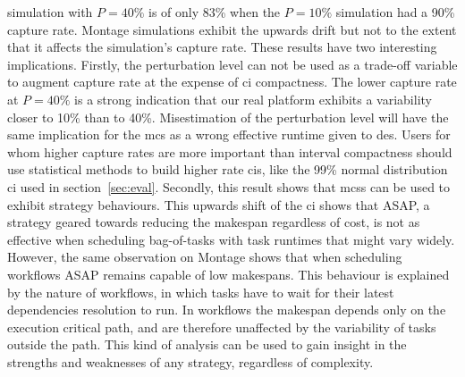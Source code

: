 \documentclass[]{llncs}
\begin{document}
simulation with $P\!=\!40\%$ is of only 83\% when the $P\!=\!10\%$ simulation had a 90\% 
capture rate. Montage simulations exhibit the upwards drift but not to the
extent that it affects the simulation's capture rate. These results have two 
interesting implications.
%
%
Firstly, the perturbation level can
not be used as a trade-off variable to augment capture rate at the expense of
\ac{ci} compactness. The lower capture rate at $P\!=\!40\%$ is a
strong indication that our real platform exhibits a variability closer to
10\% than to 40\%. Misestimation of the perturbation level will have the same
implication for the \ac{mcs} as a wrong effective runtime given to \ac{des}. 
Users for whom higher capture rates are more important than
interval compactness should use statistical methods to build higher rate \acp{ci},
like the 99\% normal distribution \ac{ci} used in section~\ref{sec:eval}.
%
Secondly, this result shows that \ac{mcs}s can be used to exhibit strategy
behaviours. This upwards shift of the \ac{ci} shows that ASAP, a strategy
geared towards reducing the makespan regardless of cost, is not as effective
when scheduling bag-of-tasks with task runtimes that might vary widely. However,
the same observation on Montage shows that when scheduling workflows ASAP 
remains capable of low makespans. This behaviour is explained by the nature of 
workflows, in which tasks have to wait for their latest dependencies resolution 
to run. In workflows the makespan depends only on the execution critical path, 
and are therefore unaffected by the variability of tasks outside the path. 
This kind of analysis can be used to gain insight in the strengths and 
weaknesses of any strategy, regardless of complexity.
\end{document}
